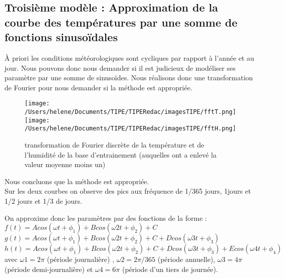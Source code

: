 \documentclass[11pt,a4paper]{article}
\begin{document}
\subsection{ Troisième modèle : Approximation de la courbe des températures par une somme de fonctions sinusoïdales}
À priori les conditions météorologiques sont cycliques par rapport à l'année et au jour. Nous pouvons donc nous demander si il est judicieux de modéliser ses paramètre par une somme de sinusoïdes. Nous réalisons donc une
transformation de Fourier pour nous demander si la méthode est appropriée. \\
\begin{figure} [!h]
\centering
\texttt{[image: /Users/helene/Documents/TIPE/TIPERedac/imagesTIPE/fftT.png]}\quad
\texttt{[image: /Users/helene/Documents/TIPE/TIPERedac/imagesTIPE/fftH.png]}
\caption{\label{fig:190101Lolita} transformation de Fourier discrète de la température et de l'humidité de la base d'entrainement (auquelles ont a enlevé la valeur moyenne moins un)}
\end{figure}
Nous concluons que la méthode est appropriée. \\
Sur les deux courbes on observe des pics aux fréquence de 1/365 jours, 1jours et 1/2 jours et 1/3 de jours.

On approxime donc les paramètres par des fonctions de la forme : \\
 $f(t) = A cos (\omega t + \phi_{1}) + B cos (\omega2 t + \phi_{2}) + C$  \\
$g(t) = A cos (\omega t + \phi_{1}) + B cos (\omega2 t + \phi_{2}) + C + D cos (\omega3 t + \phi_{3})$ \\
$h(t) = A cos (\omega t + \phi_{1}) + B cos (\omega2 t + \phi_{2}) + C + D cos (\omega3 t + \phi_{3}) + E cos (\omega4 t + \phi_{4})$ \\ 
avec $\omega1 = 2 \pi$ (période journalière) , $\omega2 = 2 \pi /365$ (période annuelle), $\omega3 = 4 \pi$ (période demi-journalière) et $\omega4 = 6\pi$ (période d'un tiers de journée).\\
\end{document}
